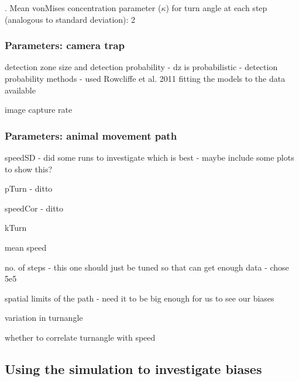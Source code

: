 \documentclass[a4paper,12pt,twoside]{report}
\begin{document}
. Mean vonMises concentration parameter (\begin{math}\kappa\end{math}) for turn angle at each step (analogous to standard deviation): 2
\medskip







	
	
	
	
	
	
	
	
	
	
	
	
	
	
	
	
	
	\subsubsection{Parameters: camera trap}
	
	detection zone size and detection probability
	- dz is probabilistic
	- detection probability methods - used Rowcliffe et al. 2011 fitting the models to the data available
	
	
	image capture rate
	
	
	\subsubsection{Parameters: animal movement path}
	
	speedSD
	- did some runs to investigate which is best
	- maybe include some plots to show this?
	
	pTurn
	- ditto
	
	speedCor
	- ditto
	
	kTurn
	
	mean speed
	
	no. of steps
	- this one should just be tuned so that can get enough data 
	- chose 5e5
	
	spatial limits of the path
	- need it to be big enough for us to see our biases
	
	variation in turnangle
	
	whether to correlate turnangle with speed
	
	\subsection{Using the simulation to investigate biases}
	
\end{document}
